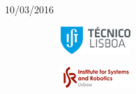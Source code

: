 \begin{titlepage}


{\large 10/03/2016}\\[1cm] %




\begin{figure}
\centering
\begin{subfigure}{.5\textwidth}
  \centering
  \includegraphics[width=.5\linewidth]{ist-logo.png}
  \label{fig:sub1}
\end{subfigure}%
\begin{subfigure}{.5\textwidth}
  \centering
  \includegraphics[width=.5\linewidth]{isr-logo.png}
  \label{fig:sub2}
\end{subfigure}
\label{fig:test}
\end{figure}
 

\vfill %

\end{titlepage}

